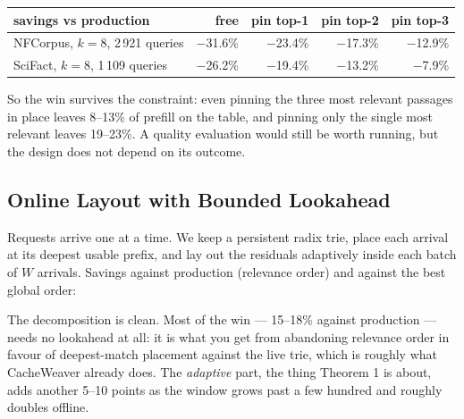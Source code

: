 \documentclass[11pt]{article}
\theoremstyle{plain}
\begin{document}
\begin{center}\small
\begin{tabular}{lrrrr}\toprule
savings vs production & free & pin top-1 & pin top-2 & pin top-3 \\ \midrule
NFCorpus, $k=8$, 2\,921 queries & $-$31.6\% & $-$23.4\% & $-$17.3\% & $-$12.9\% \\
SciFact, $k=8$, 1\,109 queries & $-$26.2\% & $-$19.4\% & $-$13.2\% & $-$7.9\% \\
\bottomrule\end{tabular}\end{center}

So the win survives the constraint: even pinning the three most relevant passages in place leaves 8--13\% of prefill on the table, and pinning only the single most relevant leaves 19--23\%. A quality evaluation would still be worth running, but the design does not depend on its outcome.

\subsection{Online Layout with Bounded Lookahead}

Requests arrive one at a time. We keep a persistent radix trie, place each arrival at its deepest usable prefix, and lay out the residuals adaptively inside each batch of $W$ arrivals. Savings against production (relevance order) and against the best global order:

\begin{center}\small
{}\end{center}

The decomposition is clean. Most of the win --- 15--18\% against production --- needs no lookahead at all: it is what you get from abandoning relevance order in favour of deepest-match placement against the live trie, which is roughly what CacheWeaver already does. The \emph{adaptive} part, the thing Theorem 1 is about, adds another 5--10 points as the window grows past a few hundred and roughly doubles offline.
\end{document}
